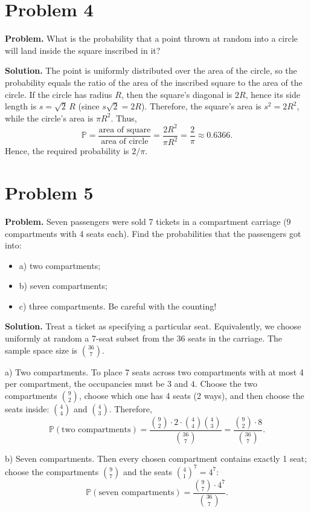 \documentclass{article}
\begin{document}
\section{Problem 4}

\textbf{Problem.} What is the probability that a point thrown at random into a circle will land inside the square inscribed in it?

\textbf{Solution.} The point is uniformly distributed over the area of the circle, so the probability equals the ratio of the area of the inscribed square to the area of the circle. If the circle has radius $R$, then the square's diagonal is $2R$, hence its side length is $s = \sqrt{2}\,R$ (since $s\sqrt{2} = 2R$). Therefore, the square's area is $s^2 = 2R^2$, while the circle's area is $\pi R^2$. Thus,
\[
\mathbb{P} = \frac{\text{area of square}}{\text{area of circle}} = \frac{2R^2}{\pi R^2} = \frac{2}{\pi} \approx 0.6366.
\]
Hence, the required probability is $2/\pi$.
\section{Problem 5}

\textbf{Problem.} Seven passengers were sold 7 tickets in a compartment carriage (9 compartments with 4 seats each). Find the probabilities that the passengers got into:
\begin{itemize}
\item a) two compartments;
\item b) seven compartments;
\item c) three compartments. Be careful with the counting!
\end{itemize}

\textbf{Solution.} Treat a ticket as specifying a particular seat. Equivalently, we choose uniformly at random a 7-seat subset from the 36 seats in the carriage. The sample space size is \(\binom{36}{7}\).

a) Two compartments. To place 7 seats across two compartments with at most 4 per compartment, the occupancies must be \(3\) and \(4\). Choose the two compartments \(\binom{9}{2}\), choose which one has 4 seats (2 ways), and then choose the seats inside: \(\binom{4}{4}\) and \(\binom{4}{3}\). Therefore,
\[
\mathbb{P}(\text{two compartments})
= \frac{\binom{9}{2}\cdot 2 \cdot \binom{4}{4}\binom{4}{3}}{\binom{36}{7}}
= \frac{\binom{9}{2}\cdot 8}{\binom{36}{7}}.
\]

b) Seven compartments. Then every chosen compartment contains exactly 1 seat; choose the compartments \(\binom{9}{7}\) and the seats \(\binom{4}{1}^7=4^7\):
\[
\mathbb{P}(\text{seven compartments})
= \frac{\binom{9}{7}\cdot 4^7}{\binom{36}{7}}.
\]
\end{document}
